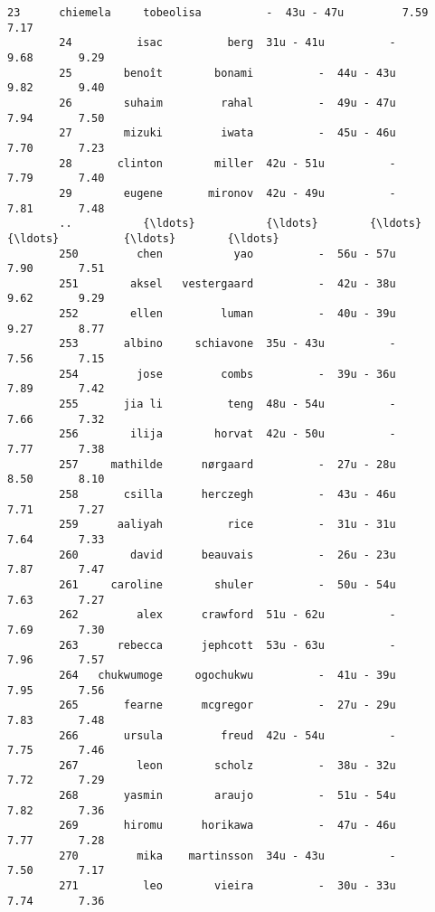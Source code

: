\documentclass[11pt]{article}
\begin{document}
\begin{Verbatim}[commandchars=\\\{\}]
        23      chiemela     tobeolisa          -  43u - 47u         7.59       7.17   
        24          isac          berg  31u - 41u          -         9.68       9.29   
        25        benoît        bonami          -  44u - 43u         9.82       9.40   
        26        suhaim         rahal          -  49u - 47u         7.94       7.50   
        27        mizuki         iwata          -  45u - 46u         7.70       7.23   
        28       clinton        miller  42u - 51u          -         7.79       7.40   
        29        eugene       mironov  42u - 49u          -         7.81       7.48   
        ..           {\ldots}           {\ldots}        {\ldots}        {\ldots}          {\ldots}        {\ldots}   
        250         chen           yao          -  56u - 57u         7.90       7.51   
        251        aksel   vestergaard          -  42u - 38u         9.62       9.29   
        252        ellen         luman          -  40u - 39u         9.27       8.77   
        253       albino     schiavone  35u - 43u          -         7.56       7.15   
        254         jose         combs          -  39u - 36u         7.89       7.42   
        255       jia li          teng  48u - 54u          -         7.66       7.32   
        256        ilija        horvat  42u - 50u          -         7.77       7.38   
        257     mathilde      nørgaard          -  27u - 28u         8.50       8.10   
        258       csilla      herczegh          -  43u - 46u         7.71       7.27   
        259      aaliyah          rice          -  31u - 31u         7.64       7.33   
        260        david      beauvais          -  26u - 23u         7.87       7.47   
        261     caroline        shuler          -  50u - 54u         7.63       7.27   
        262         alex      crawford  51u - 62u          -         7.69       7.30   
        263      rebecca      jephcott  53u - 63u          -         7.96       7.57   
        264   chukwumoge     ogochukwu          -  41u - 39u         7.95       7.56   
        265       fearne      mcgregor          -  27u - 29u         7.83       7.48   
        266       ursula         freud  42u - 54u          -         7.75       7.46   
        267         leon        scholz          -  38u - 32u         7.72       7.29   
        268       yasmin        araujo          -  51u - 54u         7.82       7.36   
        269       hiromu      horikawa          -  47u - 46u         7.77       7.28   
        270         mika    martinsson  34u - 43u          -         7.50       7.17   
        271          leo        vieira          -  30u - 33u         7.74       7.36   

\end{Verbatim}
\end{document}

